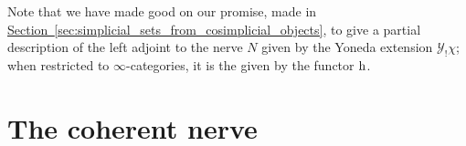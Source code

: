 \documentclass[main.tex]{subfiles}
\begin{document}
Note that we have made good on our promise, made in \hyperref[sec:simplicial_sets_from_cosimplicial_objects]{Section~\ref*{sec:simplicial_sets_from_cosimplicial_objects}}, to give a partial description of the left adjoint to the nerve $N$ given by the Yoneda extension $\mathcal{Y}_{!}\chi$; when restricted to $\infty$-categories, it is the given by the functor $\mathrm{h}$.

\section{The coherent nerve}
\label{sec:the_coherent_nerve}

%
%
%
%
\end{document}
